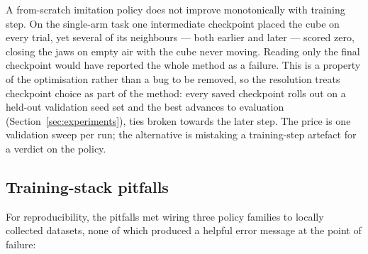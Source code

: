 A from-scratch imitation policy does not improve monotonically with
training step. On the single-arm task one intermediate checkpoint placed
the cube on every trial, yet several of its neighbours --- both earlier
and later --- scored zero, closing the jaws on empty air with the cube
never moving. Reading only the final checkpoint would have reported the
whole method as a failure. This is a property of the optimisation rather
than a bug to be removed, so the resolution treats checkpoint choice as
part of the method: every saved checkpoint rolls out on a held-out
validation seed set and the best advances to evaluation
(Section~\ref{sec:experiments}), ties broken towards the later step. The
price is one validation sweep per run; the alternative is mistaking a
training-step artefact for a verdict on the policy.

\subsection{Training-stack pitfalls}
\label{sec:diff-tooling}

For reproducibility, the pitfalls met wiring three policy families to
locally collected datasets, none of which produced a helpful error
message at the point of failure:

